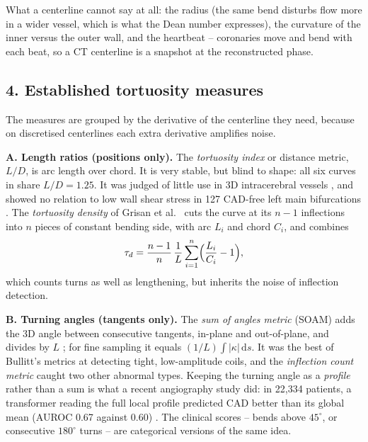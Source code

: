 What a centerline cannot say at all: the radius (the same bend disturbs flow more in a wider
vessel, which is what the Dean number expresses), the curvature of the inner versus the outer wall,
and the heartbeat -- coronaries move and bend with each beat, so a CT centerline is a snapshot at
the reconstructed phase.

\subsection*{4. Established tortuosity measures}

The measures are grouped by the derivative of the centerline they need, because on discretised
centerlines each extra derivative amplifies noise.

\textbf{A. Length ratios (positions only).}
The \emph{tortuosity index} or distance metric, $L/D$, is arc length over chord. It is very stable,
but blind to shape: all six curves in  share $L/D = 1.25$.
It was judged of little use in 3D intracerebral vessels \cite{bullitt2003tortuosity}, and showed no
relation to low wall shear stress in 127 CAD-free left main bifurcations \cite{kashyap2022tortuosity}.
The \emph{tortuosity density} of Grisan et al.\ \cite{grisan2008tortuosity} cuts the curve at its
$n-1$ inflections into $n$ pieces of constant bending side, with arc $L_i$ and chord $C_i$, and
combines
\begin{equation}
  \tau_d = \frac{n-1}{n}\,\frac{1}{L}\sum_{i=1}^{n}\Bigl(\frac{L_i}{C_i} - 1\Bigr),
\end{equation}
which counts turns as well as lengthening, but inherits the noise of inflection detection.

\textbf{B. Turning angles (tangents only).}
The \emph{sum of angles metric} (SOAM) adds the 3D angle between consecutive tangents, in-plane and
out-of-plane, and divides by $L$ \cite{bullitt2003tortuosity}; for fine sampling it equals
$(1/L)\int\lvert\kappa\rvert\,\mathrm ds$. It was the best of Bullitt's metrics at detecting tight,
low-amplitude coils, and the \emph{inflection count metric} caught two other abnormal types.
Keeping the turning angle as a \emph{profile} rather than a sum is what a recent angiography study
did: in 22,334 patients, a transformer reading the full local profile predicted CAD better than its
global mean (AUROC 0.67 against 0.60) \cite{telloayala2026tortuosity}. The clinical scores --
bends above $45^\circ$, or consecutive $180^\circ$ turns \cite{groves2009tortuosity} -- are
categorical versions of the same idea.

